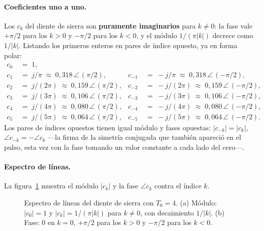 \documentclass[class=book, crop=false]{standalone}
\begin{document}
\paragraph{Coeficientes uno a uno.}
Los $c_k$ del diente de sierra son \textbf{puramente
imaginarios} para $k\neq 0$: la fase vale $+\pi/2$ para los
$k>0$ y $-\pi/2$ para los $k<0$, y el módulo $1/(\pi|k|)$
decrece como $1/|k|$. Listando los primeros enteros en pares
de índice opuesto, ya en forma polar:
\begin{align*}
    c_0 &\;=\; 1, \\[2pt]
    c_1 &\;=\; j/\pi
            \;\approx\; 0{,}318\,\angle\,(\pi/2),
    & c_{-1} &\;=\; -j/\pi
            \;\approx\; 0{,}318\,\angle\,(-\pi/2), \\[2pt]
    c_2 &\;=\; j/(2\pi)
            \;\approx\; 0{,}159\,\angle\,(\pi/2),
    & c_{-2} &\;=\; -j/(2\pi)
            \;\approx\; 0{,}159\,\angle\,(-\pi/2), \\[2pt]
    c_3 &\;=\; j/(3\pi)
            \;\approx\; 0{,}106\,\angle\,(\pi/2),
    & c_{-3} &\;=\; -j/(3\pi)
            \;\approx\; 0{,}106\,\angle\,(-\pi/2), \\[2pt]
    c_4 &\;=\; j/(4\pi)
            \;\approx\; 0{,}080\,\angle\,(\pi/2),
    & c_{-4} &\;=\; -j/(4\pi)
            \;\approx\; 0{,}080\,\angle\,(-\pi/2), \\[2pt]
    c_5 &\;=\; j/(5\pi)
            \;\approx\; 0{,}064\,\angle\,(\pi/2),
    & c_{-5} &\;=\; -j/(5\pi)
            \;\approx\; 0{,}064\,\angle\,(-\pi/2).
\end{align*}
Los pares de índices opuestos tienen igual módulo y fases
opuestas: $|c_{-k}|=|c_k|$, $\angle c_{-k} = -\angle c_k$
---la firma de la simetría conjugada que también apareció en
el pulso, esta vez con la fase tomando un valor constante a
cada lado del cero---.

\paragraph{Espectro de líneas.}
La figura~\ref{fig:espectro_sierra} muestra el módulo $|c_k|$ y
la fase $\angle c_k$ contra el índice $k$.

\begin{figure}[H]
    \centering
    \begin{minipage}{\linewidth}
        \centering
        
        \caption{Espectro de líneas del diente de sierra con
                 $T_0 = 4$. (a) Módulo: $|c_0| = 1$ y
                 $|c_k| = 1/(\pi|k|)$ para $k\neq 0$, con
                 decaimiento $1/|k|$. (b) Fase: $0$ en $k=0$,
                 $+\pi/2$ para los $k>0$ y $-\pi/2$ para los
                 $k<0$.}
        \label{fig:espectro_sierra}
    \end{minipage}
\end{figure}
\end{document}
